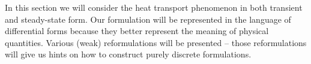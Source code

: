 \begin{discussion}
  In this section we will consider the heat transport phenomenon in both
  transient and steady-state form.
  Our formulation will be represented in the language of differential forms
  because they better represent the meaning of physical quantities.
  Various (weak) reformulations will be presented -- those reformulations will
  give us hints on how to construct purely discrete formulations.
\end{discussion}
